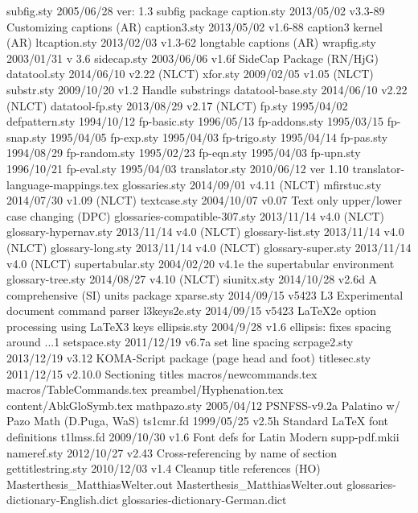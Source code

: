   subfig.sty    2005/06/28 ver: 1.3 subfig package
 caption.sty    2013/05/02 v3.3-89 Customizing captions (AR)
caption3.sty    2013/05/02 v1.6-88 caption3 kernel (AR)
ltcaption.sty    2013/02/03 v1.3-62 longtable captions (AR)
 wrapfig.sty    2003/01/31  v 3.6
 sidecap.sty    2003/06/06 v1.6f SideCap Package (RN/HjG)
datatool.sty    2014/06/10 v2.22 (NLCT)
    xfor.sty    2009/02/05 v1.05 (NLCT)
  substr.sty    2009/10/20 v1.2 Handle substrings
datatool-base.sty    2014/06/10 v2.22 (NLCT)
datatool-fp.sty    2013/08/29 v2.17 (NLCT)
      fp.sty    1995/04/02
defpattern.sty    1994/10/12
fp-basic.sty    1996/05/13
fp-addons.sty    1995/03/15
 fp-snap.sty    1995/04/05
  fp-exp.sty    1995/04/03
fp-trigo.sty    1995/04/14
  fp-pas.sty    1994/08/29
fp-random.sty    1995/02/23
  fp-eqn.sty    1995/04/03
  fp-upn.sty    1996/10/21
 fp-eval.sty    1995/04/03
translator.sty    2010/06/12 ver 1.10
translator-language-mappings.tex
glossaries.sty    2014/09/01 v4.11 (NLCT)
mfirstuc.sty    2014/07/30 v1.09 (NLCT)
textcase.sty    2004/10/07 v0.07 Text only upper/lower case changing (DPC)
glossaries-compatible-307.sty    2013/11/14 v4.0 (NLCT)
glossary-hypernav.sty    2013/11/14 v4.0 (NLCT)
glossary-list.sty    2013/11/14 v4.0 (NLCT)
glossary-long.sty    2013/11/14 v4.0 (NLCT)
glossary-super.sty    2013/11/14 v4.0 (NLCT)
supertabular.sty    2004/02/20 v4.1e the supertabular environment
glossary-tree.sty    2014/08/27 v4.10 (NLCT)
 siunitx.sty    2014/10/28 v2.6d A comprehensive (SI) units package
  xparse.sty    2014/09/15 v5423 L3 Experimental document command parser
l3keys2e.sty    2014/09/15 v5423 LaTeX2e option processing using LaTeX3 keys
ellipsis.sty    2004/9/28 v1.6 ellipsis: fixes spacing around \global\let \T1\textellipsis .\kern {}\font .\kern {}\font .\kern {}\font \T1\textellipsis 
setspace.sty    2011/12/19 v6.7a set line spacing
scrpage2.sty    2013/12/19 v3.12 KOMA-Script package (page head and foot)
titlesec.sty    2011/12/15 v2.10.0 Sectioning titles
macros/newcommands.tex
macros/TableCommands.tex
preambel/Hyphenation.tex
content/AbkGloSymb.tex
mathpazo.sty    2005/04/12 PSNFSS-v9.2a Palatino w/ Pazo Math (D.Puga, WaS) 
  ts1cmr.fd    1999/05/25 v2.5h Standard LaTeX font definitions
  t1lmss.fd    2009/10/30 v1.6 Font defs for Latin Modern
supp-pdf.mkii
 nameref.sty    2012/10/27 v2.43 Cross-referencing by name of section
gettitlestring.sty    2010/12/03 v1.4 Cleanup title references (HO)
Masterthesis_MatthiasWelter.out
Masterthesis_MatthiasWelter.out
glossaries-dictionary-English.dict    
glossaries-dictionary-German.dict    
